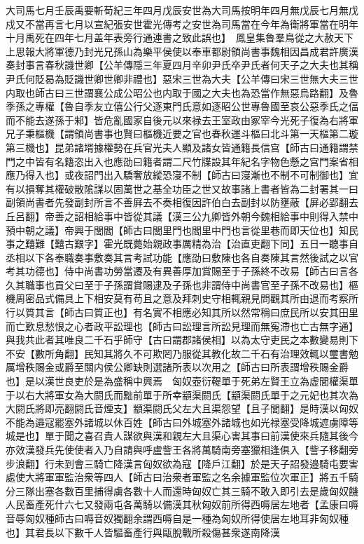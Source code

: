 大司馬七月壬辰禹要斬荀紀三年四月戊辰安世為大司馬按明年四月無戊辰七月無戊戍又不當再言七月以宣紀張安世霍光傳考之安世為司馬當在今年為衛將軍當在明年十月禹死在四年七月盖年表旁行通連書之致此誤也】　鳳皇集魯羣鳥從之大赦天下　上思報大將軍德乃封光兄孫山為樂平侯使以奉車都尉領尚書事魏相因昌成君許廣漢奏封事言春秋譏世卿【公羊傳隱三年夏四月辛卯尹氏卒尹氏者何天子之大夫也其稱尹氏何貶曷為貶譏世卿世卿非禮也】惡宋三世為大夫【公羊傳曰宋三世無大夫三世内取也師古曰三世謂襄公成公昭公也内取于國之大夫也為恐當作無惡烏路翻】及魯季孫之專權【魯自季友立僖公行父逐東門氏意如逐昭公世專魯國至哀公惡季氏之偪而不能去遂孫于邾】皆危亂國家自後元以來禄去王室政由冢宰今光死子復為右將軍兄子秉樞機【謂領尚書事也賢曰樞機近要之官也春秋運斗樞曰北斗第一天樞第二璇第三機也】昆弟諸壻據權勢在兵官光夫人顯及諸女皆通籍長信宫【師古曰通籍謂禁門之中皆有名籍恣出入也應劭曰籍者謂二尺竹牒設其年紀名字物色懸之宫門案省相應乃得入也】或夜詔門出入驕奢放縱恐寖不制【師古曰寖漸也不制不可制御也】宜有以損奪其權破散隂謀以固萬世之基全功臣之世又故事諸上書者皆為二封署其一曰副領尚書者先發副封所言不善屛去不奏相復因許伯白去副封以防壅蔽【屏必郢翻去丘呂翻】帝善之詔相給事中皆從其議【漢三公九卿皆外朝今魏相給事中則得入禁中預中朝之議】帝興于閭閻【師古曰閭里門也閻里中門也言從里巷而即天位也】知民事之囏難【囏古艱字】霍光既薨始親政事厲精為治【治直吏翻下同】五日一聽事自丞相以下各奉職奏事敷奏其言考試功能【應劭曰敷陳也各自奏陳其言然後試之以官考其功德也】侍中尚書功勞當遷及有異善厚加賞賜至于子孫終不改易【師古曰言各久其職事也貢父曰至于子孫謂賞賜逮及子孫也非謂侍中尚書官至子孫不改易也】樞機周密品式備具上下相安莫有苟且之意及拜刺史守相輒親見問觀其所由退而考察所行以質其言【師古曰質正也】有名實不相應必知其所以然常稱曰庶民所以安其田里而亡歎息愁恨之心者政平訟理也【師古曰訟理言所訟見理而無寃滯也亡古無字通】與我共此者其唯良二千石乎師守【古曰謂郡諸侯相】以為太守吏民之本數變易則下不安【數所角翻】民知其將久不可欺罔乃服從其教化故二千石有治理效輒以璽書勉厲增秩賜金或爵至關内侯公卿缺則選諸所表以次用之【師古曰所表謂增秩賜金爵也】是以漢世良吏於是為盛稱中興焉　匈奴壺衍鞮單于死弟左賢王立為虚閭權渠單于以右大將軍女為大閼氏而黜前單于所幸顓渠閼氏【顓渠閼氏單于之元妃也其次為大閼氏將即亮翻閼氏音煙支】顓渠閼氏父左大且渠怨望【且子閭翻】是時漢以匈奴不能為邉寇罷塞外諸城以休百姓【師古曰外城塞外諸城也如光禄塞受降城遮虜障等城是也】單于聞之喜召貴人謀欲與漢和親左大且渠心害其事曰前漢使來兵隨其後今亦效漢發兵先使使者入乃自請與呼盧訾王各將萬騎南旁塞獵相逢俱入【訾子移翻旁步浪翻】行未到會三騎亡降漢言匈奴欲為寇【降戶江翻】於是天子詔發邉騎屯要害處使大將軍軍監治衆等四人【師古曰治衆者軍監之名余據軍監位次軍正】將五千騎分三隊出塞各數百里捕得虜各數十人而還時匈奴亡其三騎不敢入即引去是歲匈奴饑人民畜產死什六七又發兩屯各萬騎以備漢其秋匈奴前所得西嗕居左地者【孟康曰嗕音辱匈奴種師古曰嗕音奴獨翻余謂西嗕自是一種為匈奴所得使居左地耳非匈奴種也】其君長以下數千人皆驅畜產行與甌脫戰所殺傷甚衆遂南降漢

